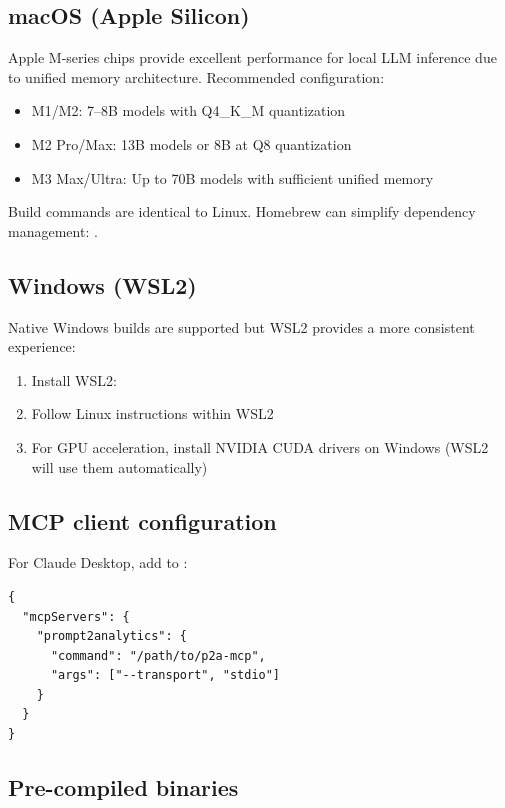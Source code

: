 \subsection{macOS (Apple Silicon)}

Apple M-series chips provide excellent performance for local LLM inference
due to unified memory architecture. Recommended configuration:

\begin{itemize}
  \item M1/M2: 7--8B models with Q4\_K\_M quantization
  \item M2 Pro/Max: 13B models or 8B at Q8 quantization
  \item M3 Max/Ultra: Up to 70B models with sufficient unified memory
\end{itemize}

\noindent Build commands are identical to Linux. Homebrew can simplify
dependency management: .

\subsection{Windows (WSL2)}

Native Windows builds are supported but WSL2 provides a more consistent
experience:

\begin{enumerate}
  \item Install WSL2: 
  \item Follow Linux instructions within WSL2
  \item For GPU acceleration, install NVIDIA CUDA drivers on Windows
    (WSL2 will use them automatically)
\end{enumerate}

\subsection{MCP client configuration}

For Claude Desktop, add to :

\begin{verbatim}
{
  "mcpServers": {
    "prompt2analytics": {
      "command": "/path/to/p2a-mcp",
      "args": ["--transport", "stdio"]
    }
  }
}
\end{verbatim}

\subsection{Pre-compiled binaries}

